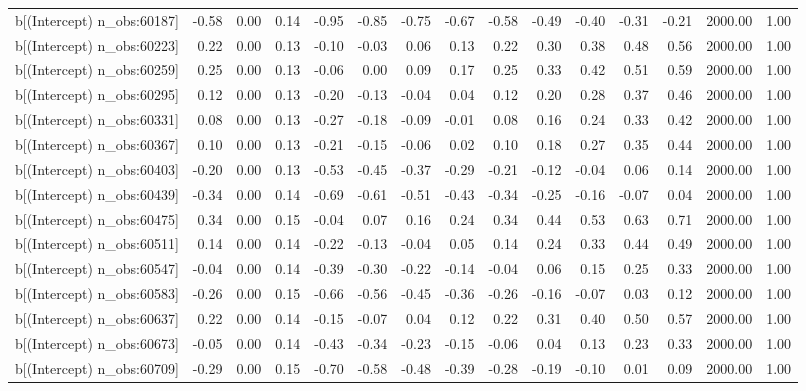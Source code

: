 \begin{table}[ht]
\begin{tabular}{rrrrrrrrrrrrrrr}
  b[(Intercept) n\_obs:60187] & -0.58 & 0.00 & 0.14 & -0.95 & -0.85 & -0.75 & -0.67 & -0.58 & -0.49 & -0.40 & -0.31 & -0.21 & 2000.00 & 1.00 \\ 
  b[(Intercept) n\_obs:60223] & 0.22 & 0.00 & 0.13 & -0.10 & -0.03 & 0.06 & 0.13 & 0.22 & 0.30 & 0.38 & 0.48 & 0.56 & 2000.00 & 1.00 \\ 
  b[(Intercept) n\_obs:60259] & 0.25 & 0.00 & 0.13 & -0.06 & 0.00 & 0.09 & 0.17 & 0.25 & 0.33 & 0.42 & 0.51 & 0.59 & 2000.00 & 1.00 \\ 
  b[(Intercept) n\_obs:60295] & 0.12 & 0.00 & 0.13 & -0.20 & -0.13 & -0.04 & 0.04 & 0.12 & 0.20 & 0.28 & 0.37 & 0.46 & 2000.00 & 1.00 \\ 
  b[(Intercept) n\_obs:60331] & 0.08 & 0.00 & 0.13 & -0.27 & -0.18 & -0.09 & -0.01 & 0.08 & 0.16 & 0.24 & 0.33 & 0.42 & 2000.00 & 1.00 \\ 
  b[(Intercept) n\_obs:60367] & 0.10 & 0.00 & 0.13 & -0.21 & -0.15 & -0.06 & 0.02 & 0.10 & 0.18 & 0.27 & 0.35 & 0.44 & 2000.00 & 1.00 \\ 
  b[(Intercept) n\_obs:60403] & -0.20 & 0.00 & 0.13 & -0.53 & -0.45 & -0.37 & -0.29 & -0.21 & -0.12 & -0.04 & 0.06 & 0.14 & 2000.00 & 1.00 \\ 
  b[(Intercept) n\_obs:60439] & -0.34 & 0.00 & 0.14 & -0.69 & -0.61 & -0.51 & -0.43 & -0.34 & -0.25 & -0.16 & -0.07 & 0.04 & 2000.00 & 1.00 \\ 
  b[(Intercept) n\_obs:60475] & 0.34 & 0.00 & 0.15 & -0.04 & 0.07 & 0.16 & 0.24 & 0.34 & 0.44 & 0.53 & 0.63 & 0.71 & 2000.00 & 1.00 \\ 
  b[(Intercept) n\_obs:60511] & 0.14 & 0.00 & 0.14 & -0.22 & -0.13 & -0.04 & 0.05 & 0.14 & 0.24 & 0.33 & 0.44 & 0.49 & 2000.00 & 1.00 \\ 
  b[(Intercept) n\_obs:60547] & -0.04 & 0.00 & 0.14 & -0.39 & -0.30 & -0.22 & -0.14 & -0.04 & 0.06 & 0.15 & 0.25 & 0.33 & 2000.00 & 1.00 \\ 
  b[(Intercept) n\_obs:60583] & -0.26 & 0.00 & 0.15 & -0.66 & -0.56 & -0.45 & -0.36 & -0.26 & -0.16 & -0.07 & 0.03 & 0.12 & 2000.00 & 1.00 \\ 
  b[(Intercept) n\_obs:60637] & 0.22 & 0.00 & 0.14 & -0.15 & -0.07 & 0.04 & 0.12 & 0.22 & 0.31 & 0.40 & 0.50 & 0.57 & 2000.00 & 1.00 \\ 
  b[(Intercept) n\_obs:60673] & -0.05 & 0.00 & 0.14 & -0.43 & -0.34 & -0.23 & -0.15 & -0.06 & 0.04 & 0.13 & 0.23 & 0.33 & 2000.00 & 1.00 \\ 
  b[(Intercept) n\_obs:60709] & -0.29 & 0.00 & 0.15 & -0.70 & -0.58 & -0.48 & -0.39 & -0.28 & -0.19 & -0.10 & 0.01 & 0.09 & 2000.00 & 1.00 \\ 

\end{tabular}
\end{table}

